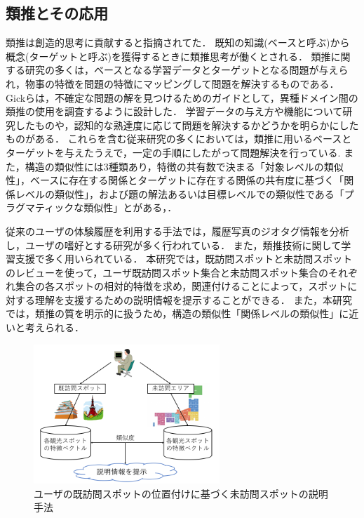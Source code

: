 \documentclass{deimj}
\begin{document}
\subsection{類推とその応用}
類推は創造的思考に貢献すると指摘されてた\cite{Codd04}．
既知の知識(ベースと呼ぶ)から概念(ターゲットと呼ぶ)を獲得するときに類推思考が働くとされる\cite{Codd05}．
類推に関する研究の多くは，ベースとなる学習データとターゲットとなる問題が与えられ，物事の特徴を問題の特徴にマッピングして問題を解決するもの\cite{Codd06}である．
Gickらは，不確定な問題の解を見つけるためのガイドとして，異種ドメイン間の類推の使用を調査するように設計した．
学習データの与え方や機能について研究したもの\cite{Codd07}や，認知的な熟達度に応じて問題を解決するかどうかを明らかにしたもの\cite{Codd08}がある．
これらを含む従来研究の多くにおいては，類推に用いるベースとターゲットを与えたうえで，一定の手順にしたがって問題解決を行っている.
また，構造の類似性には3種類あり，特徴の共有数で決まる「対象レベルの類似性」，ベースに存在する関係とターゲットに存在する関係の共有度に基づく「関係レベルの類似性」，および題の解法あるいは目標レベルでの類似性である「プラグマティックな類似性」とがある\cite{Codd05}，\cite{Codd09}．

従来のユーザの体験履歴を利用する手法では，履歴写真のジオタグ情報を分析し，ユーザの嗜好とする研究が多く行われている．
また，類推技術に関して学習支援で多く用いられている．
本研究では，既訪問スポットと未訪問スポットのレビューを使って，ユーザ既訪問スポット集合と未訪問スポット集合のそれぞれ集合の各スポットの相対的特徴を求め，関連付けることによって，スポットに対する理解を支援するための説明情報を提示することができる．
また，本研究では，類推の質を明示的に扱うため，構造の類似性「関係レベルの類似性」に近いと考えられる．

\begin{figure}[t]
  \begin{center}
    \includegraphics[clip,width=7.0cm]{picture/Photo_Image_jap.png}
    \caption{ユーザの既訪問スポットの位置付けに基づく未訪問スポットの説明手法}
    \label{fig:Photo_Image}
   \end{center}
\end{figure}
\end{document}
